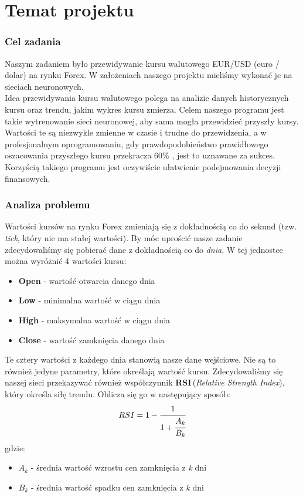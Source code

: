 \documentclass[a4paper]{article}
\begin{document}
	\part{Temat projektu}
		\section{Cel zadania}\indent\indent
		Naszym zadaniem było przewidywanie kursu walutowego EUR/USD (euro / dolar) na rynku Forex. W założeniach naszego projektu mieliśmy wykonać je na sieciach neuronowych.\\\indent
		Idea przewidywania kursu walutowego polega na analizie danych historycznych kursu oraz trendu, jakim wykres kursu zmierza. Celem naszego programu jest takie wytrenowanie sieci neuronowej, aby sama mogła przewidzieć przyszły kursy. Wartości te są niezwykle zmienne w czasie i trudne do przewidzenia, a w profesjonalnym oprogramowaniu, gdy  prawdopodobieństwo prawidłowego oszacowania przyszłego kursu przekracza 60\% , jest to uznawane za sukces. Korzyścią takiego programu jest oczywiście ułatwienie podejmowania decyzji finansowych.
		\section{Analiza problemu}\label{sec:analiza}\indent\indent
			Wartości kursów na rynku Forex zmieniają się z dokładnością co do sekund (tzw. \emph{tick}, który nie ma stałej wartości). By móc uprościć nasze zadanie zdecydowaliśmy się pobierać dane z dokładnością co do \textit{dnia}. W tej jednostce można wyróżnić 4 wartości kursu:
			\begin{itemize}
				\item \textbf{Open} - wartość otwarcia danego dnia
				\item \textbf{Low} - minimalna wartość w ciągu dnia
				\item \textbf{High} - maksymalna wartość w ciągu dnia
				\item \textbf{Close} - wartość zamknięcia danego dnia
			\end{itemize}
			Te cztery wartości z każdego dnia stanowią nasze dane wejściowe. Nie są to również jedyne parametry, które określają wartość kursu. Zdecydowaliśmy się naszej sieci przekazywać również współczynnik \textbf{RSI}\,(\emph{Relative Strength Index}), który określa siłę trendu. Oblicza się go w następujący sposób:
			$$ RSI=1-\cfrac{1}{1+\cfrac{A_k}{B_k}}$$
			gdzie:
			\begin{itemize}
				\item $ A_k $ - średnia wartość wzrostu cen zamknięcia z \textit{k} dni
				\item $ B_k $ - średnia wartość spadku cen zamknięcia z \textit{k} dni
			\end{itemize}
\end{document}
